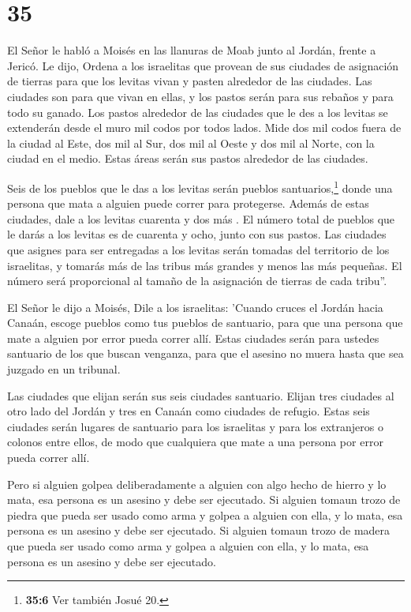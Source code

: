 \hypertarget{section-34}{%
\section{35}\label{section-34}}

 El Señor le habló a Moisés en las llanuras de Moab junto al
Jordán, frente a Jericó. Le dijo,  Ordena a los israelitas
que provean de sus ciudades de asignación de tierras para que los
levitas vivan y pasten alrededor de las ciudades.  Las
ciudades son para que vivan en ellas, y los pastos serán para sus
rebaños y para todo su ganado.  Los pastos alrededor de las
ciudades que le des a los levitas se extenderán desde el muro mil codos
por todos lados.  Mide dos mil codos fuera de la ciudad al
Este, dos mil al Sur, dos mil al Oeste y dos mil al Norte, con la ciudad
en el medio. Estas áreas serán sus pastos alrededor de las ciudades.

 Seis de los pueblos que le das a los levitas serán pueblos
santuarios,\footnote{\textbf{35:6} Ver también Josué 20.} donde una
persona que mata a alguien puede correr para protegerse. Además de estas
ciudades, dale a los levitas cuarenta y dos más .  El número
total de pueblos que le darás a los levitas es de cuarenta y ocho, junto
con sus pastos.  Las ciudades que asignes para ser
entregadas a los levitas serán tomadas del territorio de los israelitas,
y tomarás más de las tribus más grandes y menos las más pequeñas. El
número será proporcional al tamaño de la asignación de tierras de cada
tribu''.

 El Señor le dijo a Moisés,  Dile a los
israelitas: 'Cuando cruces el Jordán hacia Canaán,  escoge
pueblos como tus pueblos de santuario, para que una persona que mate a
alguien por error pueda correr allí.  Estas ciudades serán
para ustedes santuario de los que buscan venganza, para que el asesino
no muera hasta que sea juzgado en un tribunal.

 Las ciudades que elijan serán sus seis ciudades santuario.
 Elijan tres ciudades al otro lado del Jordán y tres en
Canaán como ciudades de refugio.  Estas seis ciudades serán
lugares de santuario para los israelitas y para los extranjeros o
colonos entre ellos, de modo que cualquiera que mate a una persona por
error pueda correr allí.

 Pero si alguien golpea deliberadamente a alguien con algo
hecho de hierro y lo mata, esa persona es un asesino y debe ser
ejecutado.  Si alguien tomaun trozo de piedra que pueda ser
usado como arma y golpea a alguien con ella, y lo mata, esa persona es
un asesino y debe ser ejecutado.  Si alguien tomaun trozo
de madera que pueda ser usado como arma y golpea a alguien con ella, y
lo mata, esa persona es un asesino y debe ser ejecutado.

